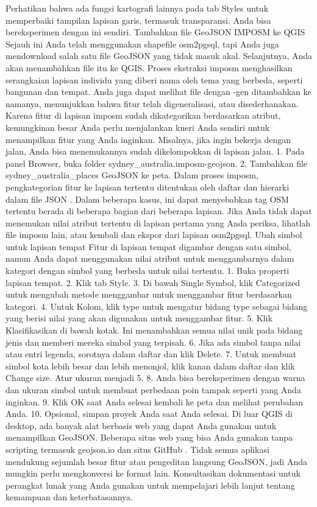 Perhatikan bahwa ada fungsi kartografi lainnya pada tab Styles untuk memperbaiki tampilan lapisan garis, termasuk transparansi. Anda bisa bereksperimen dengan ini sendiri.
Tambahkan file GeoJSON IMPOSM ke QGIS
Sejauh ini Anda telah menggunakan shapefile osm2pgsql, tapi Anda juga mendownload salah satu file GeoJSON yang tidak masuk akal. Selanjutnya, Anda akan menambahkan file itu ke QGIS.
Proses ekstraksi imposm menghasilkan serangkaian lapisan individu yang diberi nama oleh tema yang berbeda, seperti bangunan dan tempat. Anda juga dapat melihat file dengan -gen ditambahkan ke namanya, menunjukkan bahwa fitur telah digeneralisasi, atau disederhanakan. Karena fitur di lapisan imposm sudah dikategorikan berdasarkan atribut, kemungkinan besar Anda perlu menjalankan kueri Anda sendiri untuk menampilkan fitur yang Anda inginkan. Misalnya, jika ingin bekerja dengan jalan, Anda bisa menemukannya sudah dikelompokkan di lapisan jalan.
1.	Pada panel Browser, buka folder sydney_australia.imposm-geojson.
2.	Tambahkan file sydney_australia_places GeoJSON ke peta.
Dalam proses imposm, pengkategorian fitur ke lapisan tertentu ditentukan oleh daftar dan hierarki dalam file JSON . Dalam beberapa kasus, ini dapat menyebabkan tag OSM tertentu berada di beberapa bagian dari beberapa lapisan. Jika Anda tidak dapat menemukan nilai atribut tertentu di lapisan pertama yang Anda periksa, lihatlah file imposm lain, atau kembali dan ekspor dari lapisan osm2pgsql.
Ubah simbol untuk lapisan tempat
Fitur di lapisan tempat digambar dengan satu simbol, namun Anda dapat menggunakan nilai atribut untuk menggambarnya dalam kategori dengan simbol yang berbeda untuk nilai tertentu.
1.	Buka properti lapisan tempat.
2.	Klik tab Style.
3.	Di bawah Single Symbol, klik Categorized untuk mengubah metode menggambar untuk menggambar fitur berdasarkan kategori.
4.	Untuk Kolom, klik type untuk mengatur bidang type sebagai bidang yang berisi nilai yang akan digunakan untuk menggambar fitur.
5.	Klik Klasifikasikan di bawah kotak. Ini menambahkan semua nilai unik pada bidang jenis dan memberi mereka simbol yang terpisah.
6.	Jika ada simbol tanpa nilai atau entri legenda, sorotnya dalam daftar dan klik Delete.
7.	Untuk membuat simbol kota lebih besar dan lebih menonjol, klik kanan dalam daftar dan klik Change size. Atur ukuran menjadi 5.
8.	Anda bisa bereksperimen dengan warna dan ukuran simbol untuk membuat perbedaan poin tampak seperti yang Anda inginkan.
9.	Klik OK saat Anda selesai kembali ke peta dan melihat perubahan Anda.
10.	Opsional, simpan proyek Anda saat Anda selesai.
Di luar QGIS di desktop, ada banyak alat berbasis web yang dapat Anda gunakan untuk menampilkan GeoJSON. Beberapa situs web yang bisa Anda gunakan tanpa scripting termasuk geojson.io dan situs GitHub . Tidak semua aplikasi mendukung sejumlah besar fitur atau pengeditan langsung GeoJSON, jadi Anda mungkin perlu mengkonversi ke format lain. Konsultasikan dokumentasi untuk perangkat lunak yang Anda gunakan untuk mempelajari lebih lanjut tentang kemampuan dan keterbatasannya.
